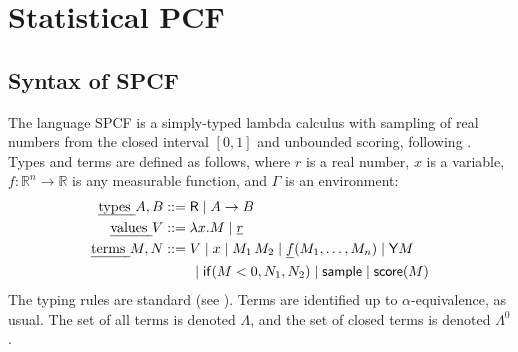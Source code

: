 \section{Statistical PCF}
\label{sec:SPCF}

\subsection{Syntax of SPCF}

The language SPCF is a simply-typed lambda calculus with sampling of real numbers from the closed interval $[0,1]$ and unbounded scoring, following \cite{MakOPW21}. 
Types and terms are defined as follows, where $r$ is a real number, $x$ is a variable, $f : \mathbb{R}^n \to \mathbb{R}$ is any measurable function, and $\Gamma$ is an environment:
\begin{align*}
  \text{\em types } A, B &::= \textsf{R}  \mid  A \to B \\
  \text{\em values } V &::= \lambda x.M  \mid  \underline{r} \\
  \text{\em terms } M, N &::= V  \mid  x  \mid  M_1 \, M_2  \mid  \underline{f}(M_1,\dots ,M_n)  \mid  \mathsf{Y} M \\
   & \qquad \mid  \mathsf{if}(M < 0, N_1, N_2)  \mid  \mathsf{sample}  \mid  \mathsf{score}(M)
\end{align*}
The typing rules are standard (see ).
Terms are identified up to $\alpha$-equivalence, as usual. 
The set of all terms is denoted $\Lambda$, and the set of closed terms is denoted $\Lambda^0$.

